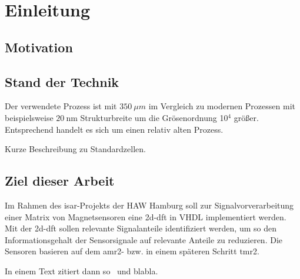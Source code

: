 \chapter{Einleitung}
 \section{Motivation}

\section{Stand der Technik}
Der verwendete Prozess ist mit $\SI{350}{\mu m}$ im Vergleich zu modernen Prozessen mit beispielsweise $\SI{20}{\nm}$ Strukturbreite um die Grösenordnung 10$^4$ größer. Entsprechend handelt es 
sich um einen relativ alten Prozess.

Kurze Beschreibung zu Standardzellen.


\section{Ziel dieser Arbeit}
Im Rahmen des \gls{isar}-Projekts der HAW Hamburg soll zur Signalvorverarbeitung einer Matrix von Magnetsensoren  eine \gls{2d-dft} in VHDL implementiert werden. Mit der 
\gls{2d-dft} sollen relevante Signalanteile identifiziert werden, um so den Informationsgehalt der Sensorsignale auf relevante Anteile zu reduzieren. Die Sensoren basieren auf 
dem \gls{amr2}- bzw. in einem späteren Schritt \gls{tmr2}.

In einem Text zitiert dann so~\autocite[10-20]{krey2015systemarchitektur} und blabla.

